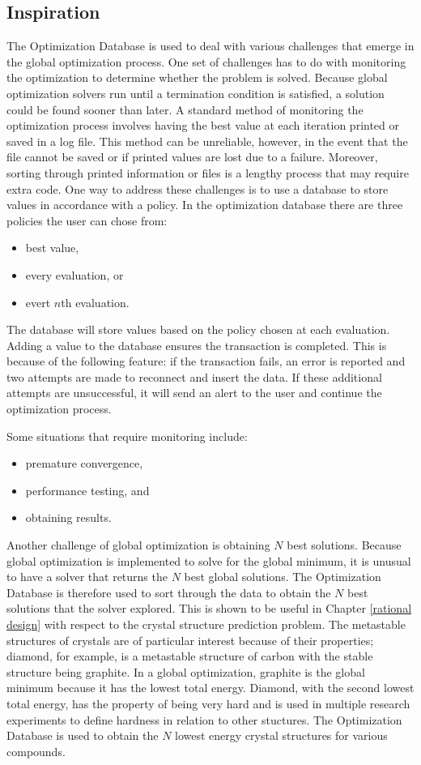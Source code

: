 \subsection{Inspiration}
The Optimization Database is used to deal with various challenges that emerge in the global optimization process. One set of challenges has to do with monitoring the optimization to determine whether the problem is solved. Because global optimization solvers run until a termination condition is satisfied, a solution could be found sooner than later. A standard method of monitoring the optimization process involves having the best value at each iteration printed or saved in a log file. This method can be unreliable, however, in the event that the file cannot be saved or if printed values are lost due to a failure. Moreover, sorting through printed information or files is a lengthy process that may require extra code. One way to address these challenges is to use a database to store values in accordance with a policy. In the optimization database there are three policies the user can chose from:
\begin{itemize}
    \item best value, 
    \item every evaluation, or
    \item evert $n$th evaluation.
\end{itemize}
The database will store values based on the policy chosen at each evaluation. Adding a value to the database ensures the transaction is completed. This is because of the following feature: if the transaction fails, an error is reported and two attempts are made to reconnect and insert the data. If these additional attempts are unsuccessful, it will send an alert to the user and continue the optimization process. 

 
Some situations that require monitoring include:
\begin{itemize}
    \item premature convergence, 
    \item performance testing, and
    \item obtaining results.
\end{itemize}

Another challenge of global optimization is obtaining $N$ best solutions. Because global optimization is implemented to solve for the global minimum, it is unusual to have a solver that returns the $N$ best global solutions. The Optimization Database is therefore used to sort through the data to obtain the $N$ best solutions that the solver explored. This is shown to be useful in Chapter \ref{rational design} with respect to the crystal structure prediction problem. The metastable structures of crystals are of particular interest because of their properties; diamond, for example, is a metastable structure of carbon with the stable structure being graphite. In a global optimization, graphite is the global minimum because it has the lowest total energy. Diamond, with the second lowest total energy, has the property of being very hard and is used in multiple research experiments to define hardness in relation to other stuctures. The Optimization Database is used to obtain the $N$ lowest energy crystal structures for various compounds. 


